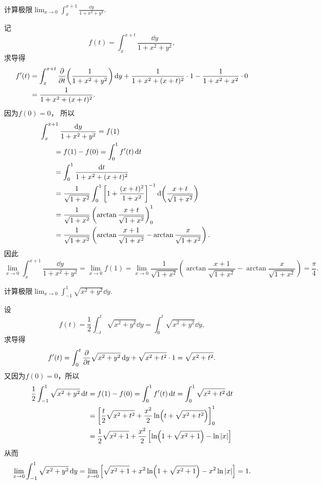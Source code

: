 \begin{example}
计算极限\(\lim_{x\to0} \int_x^{x+1} \frac{\dd{y}}{1+x^2+y^2}\).
\begin{solution}
记\[
	f(t) = \int_x^{x+t} \frac{\dd{y}}{1+x^2+y^2},
\]
求导得\begin{align*}
	f'(t)
	&= \int_x^{x+t} \pdv{t}(\frac{1}{1+x^2+y^2}) \dd{y}
	+ \frac{1}{1+x^2+(x+t)^2} \cdot 1
	- \frac{1}{1+x^2+x^2} \cdot 0 \\
	&= \frac{1}{1+x^2+(x+t)^2}.
\end{align*}
因为\(f(0) = 0\)，
所以
\begin{align*}
	&\hspace{-20pt}
	\int_x^{x+1} \frac{\dd{y}}{1+x^2+y^2}
	= f(1) \\
	&= f(1) - f(0)
	= \int_0^1 f'(t) \dd{t} \\
	&= \int_0^1 \frac{\dd{t}}{1+x^2+(x+t)^2} \\
	&= \frac{1}{\sqrt{1+x^2}}
		\int_0^1 \left[1+\frac{(x+t)^2}{1+x^2}\right]^{-1} \dd(\frac{x+t}{\sqrt{1+x^2}}) \\
	&= \frac{1}{\sqrt{1+x^2}}
		\left(\arctan\frac{x+t}{\sqrt{1+x^2}}\right)_0^1 \\
	&= \frac{1}{\sqrt{1+x^2}}
		\left(
			\arctan\frac{x+1}{\sqrt{1+x^2}}
			- \arctan\frac{x}{\sqrt{1+x^2}}
		\right).
\end{align*}
因此\[
	\lim_{x\to0} \int_x^{x+1} \frac{\dd{y}}{1+x^2+y^2}
	= \lim_{x\to0} f(1)
	= \lim_{x\to0} \frac{1}{\sqrt{1+x^2}} \left(
		\arctan\frac{x+1}{\sqrt{1+x^2}}
		- \arctan\frac{x}{\sqrt{1+x^2}}
	\right)
	= \frac{\pi}{4}.
\]
\end{solution}
\end{example}

\begin{example}%
\def\l{\lim_{x\to0}}%
计算极限\(\l \int_{-1}^1 \sqrt{x^2+y^2} \dd{y}\).
\begin{solution}
设\[
f(t)
=\frac{1}{2} \int_{-t}^t \sqrt{x^2+y^2} \dd{y}
=\int_0^t \sqrt{x^2+y^2} \dd{y},
\]
求导得\[
f'(t)
= \int_0^t \pdv{t} \sqrt{x^2+y^2} \dd{y}
	+ \sqrt{x^2+t^2} \cdot 1
= \sqrt{x^2+t^2}.
\]又因为\(f(0) = 0\)，所以\begin{align*}
\frac{1}{2} \int_{-1}^1 \sqrt{x^2+y^2} \dd{t}
&=f(1) - f(0)
= \int_0^1 f'(t) \dd{t}
= \int_0^1 \sqrt{x^2+t^2} \dd{t} \\
&= \left[
\frac{t}{2} \sqrt{x^2+t^2} + \frac{x^2}{2} \ln(t+\sqrt{x^2+t^2})
\right]_0^1 \\
&= \frac{1}{2} \sqrt{x^2+1} + \frac{x^2}{2} \left[ \ln(1+\sqrt{x^2+1}) - \ln\abs{x} \right]
\end{align*}
从而\[
\l \int_{-1}^1 \sqrt{x^2+y^2} \dd{y}
= \l \left[
\sqrt{x^2+1}
+ x^2 \ln(1+\sqrt{x^2+1}) - x^2 \ln\abs{x}
\right]
= 1.
\]
\end{solution}
\end{example}

